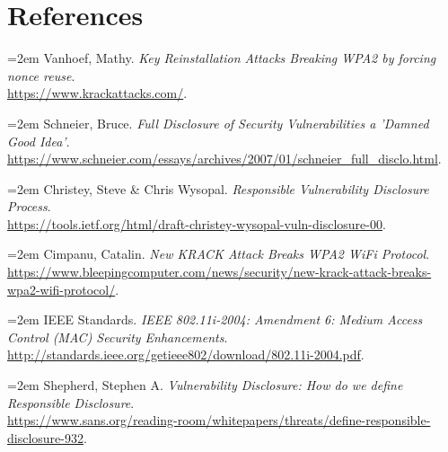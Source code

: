 \documentclass[12pt]{article}
\begin{document}
\section*{\hfil References \hfil}
\noindent \hangindent=2em
Vanhoef, Mathy.
\textit{Key Reinstallation Attacks Breaking WPA2 by forcing nonce reuse}. \\
\url{https://www.krackattacks.com/}.

\noindent \hangindent=2em
Schneier, Bruce.
\textit{Full Disclosure of Security Vulnerabilities a 'Damned Good Idea'}. \\
\url{https://www.schneier.com/essays/archives/2007/01/schneier_full_disclo.html}.

\noindent \hangindent=2em
Christey, Steve \& Chris Wysopal.
\textit{Responsible Vulnerability Disclosure Process}. \\
\url{https://tools.ietf.org/html/draft-christey-wysopal-vuln-disclosure-00}.

\noindent \hangindent=2em
Cimpanu, Catalin.
\textit{New KRACK Attack Breaks WPA2 WiFi Protocol}. \\
\url{https://www.bleepingcomputer.com/news/security/new-krack-attack-breaks-wpa2-wifi-protocol/}.

\noindent \hangindent=2em
IEEE Standards.
\textit{IEEE 802.11i-2004: Amendment 6: Medium Access Control (MAC) Security Enhancements}.
\url{http://standards.ieee.org/getieee802/download/802.11i-2004.pdf}.

\noindent \hangindent=2em
Shepherd, Stephen A.
\textit{Vulnerability Disclosure: How do we define Responsible Disclosure}. \\
\url{https://www.sans.org/reading-room/whitepapers/threats/define-responsible-disclosure-932}.

\end{document}
